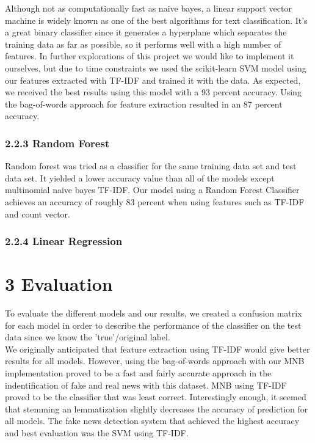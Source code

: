 \documentclass{neu_handout}
\begin{document}
Although not as computationally fast as naive bayes, a linear support vector machine is widely known as one of the best  algorithms for text classification. It's a great binary classifier since it generates a hyperplane which separates the training data as far as possible, so it performs well with a high number of features. In further explorations of this project we would like to implement it ourselves, but due to time constraints we used the scikit-learn SVM model using our features extracted with TF-IDF and trained it with the data. As expected, we received the best results using this model with a 93 percent accuracy. Using the bag-of-words approach for feature extraction resulted in an 87 percent accuracy.



\subsubsection*{2.2.3 Random Forest}

Random forest was tried as a classifier for the same training data set and test data set. It
yielded a lower accuracy value than all of the models except multinomial naive bayes TF-IDF. Our model using a Random Forest Classifier achieves an accuracy of roughly 83 percent when using features such as TF-IDF and count vector.
 
 
\subsubsection*{2.2.4 Linear Regression}


\section*{3 Evaluation}

To evaluate the different models and our results, we created a confusion matrix for each model in order to describe the performance of the classifier on the test data since we know the 'true'/original label.\\

We originally anticipated that feature extraction using TF-IDF would give better results for all models. However, using the bag-of-words approach with our MNB implementation proved to be a fast and fairly accurate approach in the indentification of fake and real news with this dataset. MNB using TF-IDF proved to be the classifier that was least correct. Interestingly enough, it seemed that stemming an lemmatization slightly decreases the accuracy of prediction for all models. The fake news detection system that achieved the highest accuracy and best evaluation was the SVM using TF-IDF.
\end{document}
